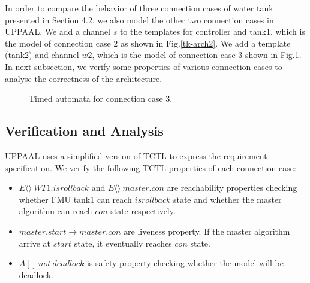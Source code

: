 In order to compare the behavior of three connection cases of water tank presented in Section 4.2, we also model the other two connection cases in UPPAAL. We add a channel $s$ to the templates for controller and tank1, which is the model of connection case 2 as shown in Fig.\ref{tk-arch2}. We add a template (tank2) and channel $w2$, which is the model of connection case 3 shown in Fig.\ref{arc3}. In next subsection, we verify some properties of various connection cases to analyse the correctness of the architecture.
\begin{figure}[htbp]
\end{figure}
\begin{figure}[htbp]
	\caption{Timed automata for connection case 3.}\label{arc3}
\end{figure}
\subsection{Verification and Analysis}
UPPAAL uses a simplified version of TCTL \cite{BouchenebGR09} to express the requirement specification. We verify the following TCTL properties of each connection case:
\begin{itemize}
\item
$E\langle\rangle~WT1.isrollback$ and $E\langle\rangle~master.con$ are reachability properties checking whether FMU tank1 can reach $isrollback$ state and whether the master algorithm can reach $con$ state respectively.
\item
$master.start \rightarrow master.con$ are liveness property. If the master algorithm arrive at $start$ state, it eventually reaches $con$ state.
\item 
$A[]~not~deadlock$ is safety property checking whether the model will be deadlock.
\end{itemize}

